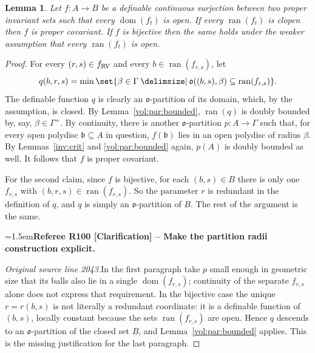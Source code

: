 \documentclass[12pt]{amsart}
\newcommand{\RefereeRemark}[4]{%
  \par\medskip\begingroup\normalfont\small\color{RefereePurple}%
  \emergencystretch=1.5em\noindent\textbf{Referee R#1 [#2] -- #3.}\par\nobreak\noindent #4\par
  \endgroup\medskip
}
\theoremstyle{plain}
\newtheorem{lem}[thm]{Lemma}
\theoremstyle{definition}
\theoremstyle{remark}
\numberwithin{equation}{section}
\theoremstyle{plain}
\newcommand{\RV}{\textup{RV}}
\DeclareMathOperator{\ran}{ran}
\DeclareMathOperator{\dom}{dom}
\newcommand{\gb}{\mathfrak{b}}
\newcommand{\go}{\mathfrak{o}}
\newcommand{\0}{\emptyset}
\newcommand{\fun}{\longrightarrow}
\newcommand{\sub}{\subseteq}
\providecommand\given{}
\newcommand\SetSymbol[1][]{%
\nonscript \: #1 \vert
\allowbreak
\nonscript\:
\mathopen{}}
\renewcommand\given{\SetSymbol[\delimsize]}
\begin{document}
\begin{lem}\label{conti:covar}
Let $f : A \fun B$ be a definable continuous surjection between two proper invariant sets such that  every $\dom(f_t)$ is open. If every $\ran(f_t)$ is clopen then $f$ is proper covariant. If $f$ is bijective then the same holds under the weaker assumption that   every $\ran(f_t)$ is open.
\end{lem}
\begin{proof}
For every $(r, s) \in f_{\RV}$ and every $b \in \ran(f_{r,s})$, let
\[
q(b,r,s) = \min\set{\beta \in \Gamma \given \go((b,s), \beta) \sub \ran(f_{r,s})}.
\]
The definable function $q$ is clearly an $\go$-partition of its domain, which, by the assumption, is closed. By Lemma~\ref{vol:par:bounded}, $\ran(q)$ is doubly bounded by, say, $\beta \in \Gamma^+$. By continuity, there is another $\go$-partition $p: A \fun \Gamma$ such that, for every open polydisc $\gb \sub A$ in question, $f(\gb)$ lies in an open polydisc of radius $\beta$. By Lemmas~\ref{inv:crit} and \ref{vol:par:bounded} again,  $p(A)$ is doubly bounded as well. It follows that $f$ is  proper covariant.

For the second claim, since $f$ is bijective, for each $(b, s) \in B$ there is only one  $f_{r,s}$ with $(b,r, s) \in \ran(f_{r,s})$. So the parameter $r$ is redundant in the definition of $q$, and  $q$ is  simply an $\go$-partition of $B$. The rest of the argument is the same.

\RefereeRemark{100}{Clarification}{Make the partition radii construction explicit}{%
\textit{Original source line 2043.}\quad In the first paragraph take $p$ small enough in geometric size that its balls also lie in a single $\dom(f_{r,s})$; continuity of the separate $f_{r,s}$ alone does not express that requirement. In the bijective case the unique $r=r(b,s)$ is not literally a redundant coordinate: it is a definable function of $(b,s)$, locally constant because the sets $\ran(f_{r,s})$ are open. Hence $q$ descends to an $\go$-partition of the closed set $B$, and Lemma~\ref{vol:par:bounded} applies. This is the missing justification for the last paragraph.
}
\end{proof}
\end{document}
